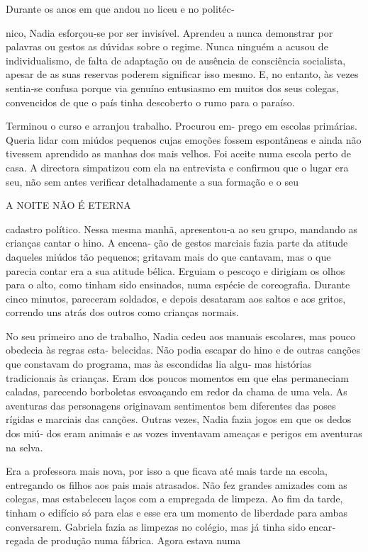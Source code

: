 Durante os anos em que andou no liceu e no politéc‑

nico, Nadia esforçou‑se por ser invisível. Aprendeu a nunca demonstrar
por palavras ou gestos as dúvidas sobre o regime. Nunca ninguém a acusou
de individualismo, de falta de adaptação ou de ausência de consciência
socialista, apesar de as suas reservas poderem significar isso mesmo. E,
no entanto, às vezes sentia‑se confusa porque via genuíno entusiasmo em
muitos dos seus colegas, convencidos de que o país tinha descoberto o
rumo para o paraíso.

Terminou o curso e arranjou trabalho. Procurou em‑ prego em escolas
primárias. Queria lidar com miúdos pequenos cujas emoções fossem
espontâneas e ainda não tivessem aprendido as manhas dos mais velhos.
Foi aceite numa escola perto de casa. A directora simpatizou com ela na
entrevista e confirmou que o lugar era seu, não sem antes verificar
detalhadamente a sua formação e o seu

A NOITE NÃO É ETERNA

cadastro político. Nessa mesma manhã, apresentou‑a ao seu grupo,
mandando as crianças cantar o hino. A encena‑ ção de gestos marciais
fazia parte da atitude daqueles miúdos tão pequenos; gritavam mais do
que cantavam, mas o que parecia contar era a sua atitude bélica. Erguiam
o pescoço e dirigiam os olhos para o alto, como tinham sido ensinados,
numa espécie de coreografia. Durante cinco minutos, pareceram soldados,
e depois desataram aos saltos e aos gritos, correndo uns atrás dos
outros como crianças normais.

No seu primeiro ano de trabalho, Nadia cedeu aos manuais escolares, mas
pouco obedecia às regras esta‑ belecidas. Não podia escapar do hino e de
outras canções que constavam do programa, mas às escondidas lia algu‑
mas histórias tradicionais às crianças. Eram dos poucos momentos em que
elas permaneciam caladas, parecendo borboletas esvoaçando em redor da
chama de uma vela. As aventuras das personagens originavam sentimentos
bem diferentes das poses rígidas e marciais das canções. Outras vezes,
Nadia fazia jogos em que os dedos dos miú‑ dos eram animais e as vozes
inventavam ameaças e perigos em aventuras na selva.

Era a professora mais nova, por isso a que ficava até mais tarde na
escola, entregando os filhos aos pais mais atrasados. Não fez grandes
amizades com as colegas, mas estabeleceu laços com a empregada de
limpeza. Ao fim da tarde, tinham o edifício só para elas e esse era um
momento de liberdade para ambas conversarem. Gabriela fazia as limpezas
no colégio, mas já tinha sido encar‑ regada de produção numa fábrica.
Agora estava numa

